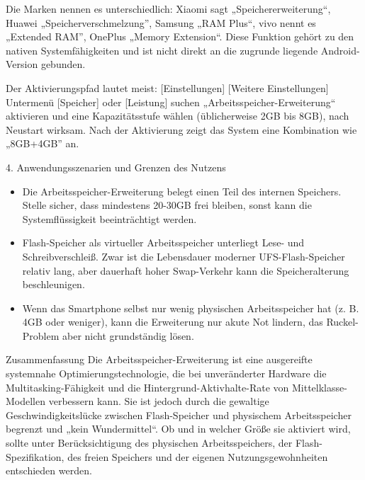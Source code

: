 
Die Marken nennen es unterschiedlich: Xiaomi sagt „Speichererweiterung“, Huawei „Speicherverschmelzung”, Samsung „RAM Plus“, vivo nennt es „Extended RAM”, OnePlus „Memory Extension“. Diese Funktion gehört zu den nativen Systemfähigkeiten und ist nicht direkt an die zugrunde liegende Android-Version gebunden.

Der Aktivierungspfad lautet meist: [Einstellungen] [Weitere Einstellungen] Untermenü [Speicher] oder [Leistung] suchen „Arbeitsspeicher-Erweiterung“ aktivieren und eine Kapazitätsstufe wählen (üblicherweise 2GB bis 8GB), nach Neustart wirksam. Nach der Aktivierung zeigt das System eine Kombination wie „8GB+4GB” an.

\begin{tcbwarn}{4. Anwendungsszenarien und Grenzen des Nutzens}
\begin{itemize}
  \item Die Arbeitsspeicher-Erweiterung belegt einen Teil des internen Speichers. Stelle sicher, dass mindestens 20-30GB frei bleiben, sonst kann die Systemflüssigkeit beeinträchtigt werden.
  \item Flash-Speicher als virtueller Arbeitsspeicher unterliegt Lese- und Schreibverschleiß. Zwar ist die Lebensdauer moderner UFS-Flash-Speicher relativ lang, aber dauerhaft hoher Swap-Verkehr kann die Speicheralterung beschleunigen.
  \item Wenn das Smartphone selbst nur wenig physischen Arbeitsspeicher hat (z. B. 4GB oder weniger), kann die Erweiterung nur akute Not lindern, das Ruckel-Problem aber nicht grundständig lösen.
\end{itemize}

\end{tcbwarn}

\begin{tcbinfo}{Zusammenfassung}
Die Arbeitsspeicher-Erweiterung ist eine ausgereifte systemnahe Optimierungstechnologie, die bei unveränderter Hardware die Multitasking-Fähigkeit und die Hintergrund-Aktivhalte-Rate von Mittelklasse-Modellen verbessern kann. Sie ist jedoch durch die gewaltige Geschwindigkeitslücke zwischen Flash-Speicher und physischem Arbeitsspeicher begrenzt und „kein Wundermittel“. Ob und in welcher Größe sie aktiviert wird, sollte unter Berücksichtigung des physischen Arbeitsspeichers, der Flash-Spezifikation, des freien Speichers und der eigenen Nutzungsgewohnheiten entschieden werden.

\end{tcbinfo}

